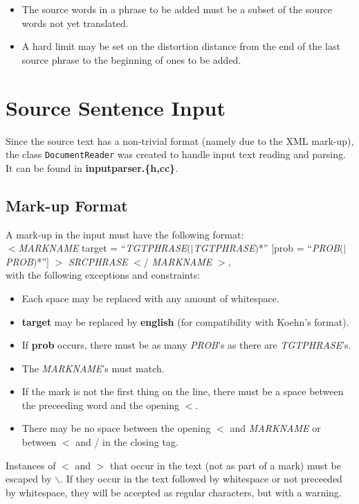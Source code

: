 \documentclass[12pt]{amsart} \usepackage{epsfig} \usepackage{rotating}
\newcommand{\file}{\textbf} \newcommand{\url}{\underline}
\newcommand{\code}{\small\texttt}
\begin{document}
\begin{itemize}
\item The source words in a phrase to be added must be a subset of the source
words not yet translated.
\item A hard limit may be set on the distortion distance from the end of the
last source phrase to the beginning of ones to be added.
\end{itemize}


\section{Source Sentence Input}
Since the source text has a non-trivial format (namely due to the XML mark-up),
the class \code{DocumentReader} was created to handle input text reading and
parsing.  It can be found in \file{inputparser.\{h,cc\}}.

\subsection{Mark-up Format}
A mark-up in the input must have the following format:\\ $<$\textit{MARKNAME}
target = ``\textit{TGTPHRASE}$(|$\textit{TGTPHRASE}$)$*'' $[$prob =
``\textit{PROB}$(|$\textit{PROB}$)$*''$]$ $>$ \textit{SRCPHRASE} $<$/
\textit{MARKNAME} $>$, \\ with the following exceptions and constraints:
\begin{itemize}
\item Each space may be replaced with any amount of whitespace.
\item \textbf{target} may be replaced by \textbf{english} (for compatibility
with Koehn's format).
\item If \textbf{prob} occurs, there must be as many \textit{PROB}'s as there
are \textit{TGTPHRASE}'s.
\item The \textit{MARKNAME}'s must match.
\item If the mark is not the first thing on the line, there must be a space
between the preceeding word and the opening $<$.
\item There may be no space between the opening $<$ and \textit{MARKNAME} or
between $<$ and / in the closing tag.
\end{itemize}

Instances of $<$ and $>$ that occur in the text (not as part of a mark) must be
escaped by $\backslash$.  If they occur in the text followed by whitespace or
not preceeded by whitespace, they will be accepted as regular characters, but
with a warning.
\end{document}
